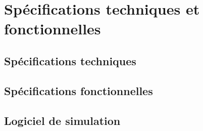 \chapter{Spécifications techniques et fonctionnelles}

    \section{Spécifications techniques}

    \section{Spécifications fonctionnelles}

    \section{Logiciel de simulation}